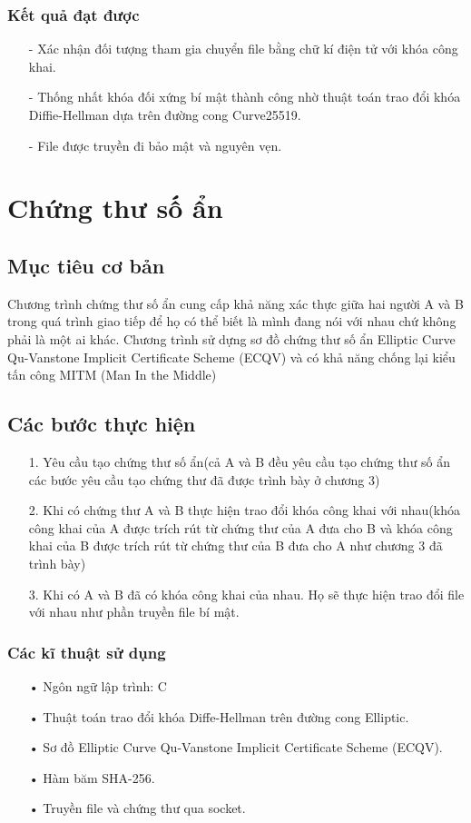 \documentclass[a4paper,12pt]{report}
\begin{document}
\subsubsection*{Kết quả đạt được}
\begin{itemize}
\item[-] Xác nhận đối tượng tham gia chuyển file bằng chữ kí điện tử với khóa công khai.
\item[-] Thống nhất khóa đối xứng bí mật thành công nhờ thuật toán trao đổi khóa Diffie-Hellman dựa trên đường cong Curve25519.
\item[-] File được truyền đi bảo mật và nguyên vẹn.
\end{itemize}
\section{Chứng thư số ẩn}
\subsection*{Mục tiêu cơ bản}
Chương trình chứng thư số ẩn cung cấp khả năng xác thực giữa hai người A và B trong quá trình giao tiếp để họ có thể biết là mình đang nói với nhau chứ không phải là một ai khác. Chương trình sử dựng sơ đồ chứng thư số ẩn Elliptic Curve Qu-Vanstone Implicit Certificate Scheme (ECQV) và có khả năng chống lại kiểu tấn công MITM (Man In the Middle)
\subsection*{Các bước thực hiện}
\begin{itemize}
\item[1. ] Yêu cầu tạo chứng thư số ẩn(cả A và B đều yêu cầu tạo chứng thư số ẩn các bước yêu cầu tạo chứng thư đã được trình bày ở chương 3)
\item[2. ] Khi có chứng thư A và B thực hiện trao đổi khóa công khai với nhau(khóa công khai của A được trích rút từ chứng thư của A đưa cho B và khóa công khai của B được trích rút từ chứng thư của B đưa cho A như chương 3 đã trình bày)
\item[3. ] Khi có A và B đã có khóa công khai của nhau. Họ sẽ thực hiện trao đổi file với nhau như phần truyền file bí mật.
\end{itemize}
\subsubsection{Các kĩ thuật sử dụng}
\begin{itemize}
\item[•] Ngôn ngữ lập trình: C
\item[•] Thuật toán trao đổi khóa Diffe-Hellman trên đường cong Elliptic.
\item[•] Sơ đồ Elliptic Curve Qu-Vanstone Implicit Certificate Scheme (ECQV).
\item[•] Hàm băm SHA-256.
\item[•] Truyền file và chứng thư qua socket.
\end{itemize}
\end{document}
